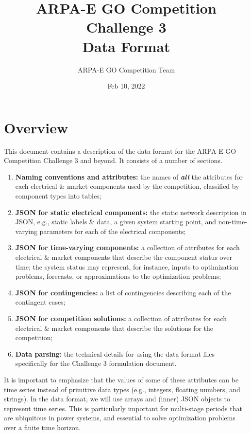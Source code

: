 \documentclass{article}
\title{ARPA-E GO Competition Challenge 3 \\ Data Format}
\author{ARPA-E GO Competition Team}
\date{Feb 10, 2022}
\begin{document}
\maketitle

\section{Overview}

This document contains a description of the data format for the ARPA-E GO Competition Challenge 3 and beyond. It consists of a number of sections.
\begin{enumerate}[I]
    \item {\bf Naming conventions and attributes:} the names of \textit{\textbf{all}} the attributes for each electrical \& market components used by the competition, classified by component types into tables;

    \item {\bf JSON for static electrical components:} the static network description in JSON, e.g., static labels \& data, a given system starting point, and non-time-varying parameters for each of the electrical components;

    \item {\bf JSON for time-varying components:} a collection of attributes for each electrical \& market components that describe the component status over time; the system status may represent, for instance, inputs to optimization problems,  forecasts, or approximations to the optimization problems;
    \item {\bf JSON for contingencies:} a list of contingencies describing each of the contingent cases;
    \item {\bf JSON for competition solutions:} a collection of attributes for each electrical \& market components that describe the solutions for the competition;    
     \item {\bf Data parsing:}
     the technical details for using the data format files specifically for the Challenge 3 formulation document.
\end{enumerate}
It is important to emphasize that the values of some of these attributes can be time series instead of primitive data types (e.g., integers, floating numbers, and strings). 
In the data format, we will use arrays and (inner) JSON objects to represent time series. 
This is particularly important for multi-stage periods that are ubiquitous in power systems, and essential 
to solve optimization problems over a finite time horizon. 
\end{document}
